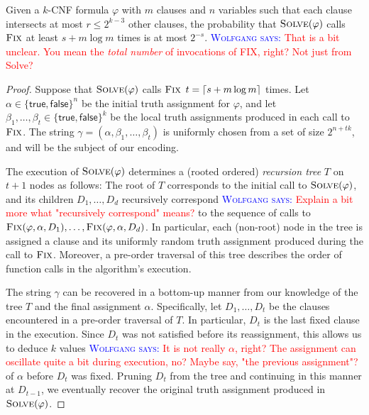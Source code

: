 \documentclass{patmorin}
\newcommand{\aremark}[3]{\textcolor{blue}{\textsc{#1 #2:}}
  \textcolor{red}{\textsf{#3}}}
\newcommand{\wolfgang}[2][says]{\aremark{Wolfgang}{#1}{#2}}
\begin{document}
\begin{thm}
%
  Given a $k$-CNF formula $\varphi$ with $m$ clauses and $n$ variables
  such that each clause intersects at most $r \le 2^{k - 3}$ other
  clauses, the probability that $\textsc{Solve}(\varphi)$ calls
  $\textsc{Fix}$ at least $s + m \log m$ times is at most $2^{-s}$.
  \wolfgang{That is a bit unclear. You mean the \emph{total number}
    of invocations of FIX, right? Not just from Solve?}
\end{thm}
\begin{proof}
  Suppose that $\textsc{Solve}(\varphi)$ calls $\textsc{Fix}$
  $t = {\lceil s + m\log m \rceil}$ times. Let
  $\alpha \in \{\textsf{true}, \textsf{false}\}^n$ be the initial
  truth assignment for $\varphi$, and let
  $\beta_1, \ldots, \beta_t \in \{\textsf{true}, \textsf{false}\}^k$
  be the local truth assignments produced in each call to
  $\textsc{Fix}$. The string
  $\gamma = (\alpha, \beta_1, \ldots, \beta_t)$ is uniformly chosen
  from a set of size $2^{n + tk}$, and will be the subject of our
  encoding.

  The execution of $\textsc{Solve}(\varphi)$ determines a (rooted
  ordered) \emph{recursion tree} $T$ on $t + 1$ nodes as follows: The
  root of $T$ corresponds to the initial call to
  $\textsc{Solve}(\varphi)$, and its children $D_1, \ldots, D_d$
  recursively correspond 
  \wolfgang{Explain a bit more what "recursively correspond" means?}
  to the sequence of calls to
  $\textsc{Fix}(\varphi, \alpha, D_1), \ldots, \textsc{Fix}(\varphi,
  \alpha, D_d)$. In particular, each (non-root) node in the tree is
  assigned a clause and its uniformly random truth assignment produced
  during the call to $\textsc{Fix}$. Moreover, a pre-order traversal
  of this tree describes the order of function calls in the
  algorithm's execution.

  The string $\gamma$ can be recovered in a bottom-up manner from our
  knowledge of the tree $T$ and the final assignment
  $\alpha$. Specifically, let $D_1, \dots, D_t$ be the clauses
  encountered in a pre-order traversal of $T$. In particular,
  $D_t$ is the last fixed clause in the execution. Since $D_t$ was not
  satisfied before its reassignment, this allows us to deduce $k$
  values \wolfgang{It is not really $\alpha$, right? The assignment
  can oscillate quite a bit during execution, no? Maybe say,
  "the previous assignment"?}
  of $\alpha$ before $D_t$ was fixed. Pruning $D_t$ from the
  tree and continuing in this manner at $D_{t - 1}$, we eventually
  recover the original truth assignment produced in
  $\textsc{Solve}(\varphi)$.


\end{proof}
\end{document}
